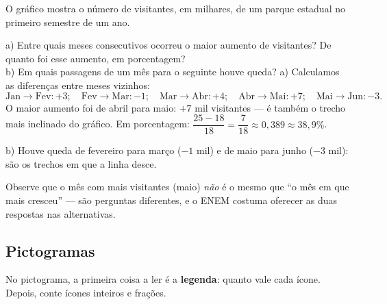 \begin{exemplo}
O gráfico mostra o número de visitantes, em milhares, de um parque estadual no
primeiro semestre de um ano.

\begin{center}
\end{center}

a) Entre quais meses consecutivos ocorreu o maior aumento de visitantes? De
quanto foi esse aumento, em porcentagem?\\
b) Em quais passagens de um mês para o seguinte houve queda?
\solucao
a) Calculamos as diferenças entre meses vizinhos:
\[
\text{Jan}\to\text{Fev}: +3;\quad
\text{Fev}\to\text{Mar}: -1;\quad
\text{Mar}\to\text{Abr}: +4;\quad
\text{Abr}\to\text{Mai}: +7;\quad
\text{Mai}\to\text{Jun}: -3.
\]
O maior aumento foi de abril para maio: $+7$ mil visitantes — é também o
trecho mais inclinado do gráfico. Em porcentagem:
$\dfrac{25-18}{18}=\dfrac{7}{18}\approx 0{,}389\approx 38{,}9\%$.

b) Houve queda de fevereiro para março ($-1$ mil) e de maio para junho
($-3$ mil): são os trechos em que a linha desce.

Observe que o mês com mais visitantes (maio) \emph{não} é o mesmo que “o mês
em que mais cresceu” — são perguntas diferentes, e o ENEM costuma oferecer as
duas respostas nas alternativas.
\end{exemplo}

\subsection{Pictogramas}

No pictograma, a primeira coisa a ler é a \textbf{legenda}: quanto vale cada
ícone. Depois, conte ícones inteiros e frações.

